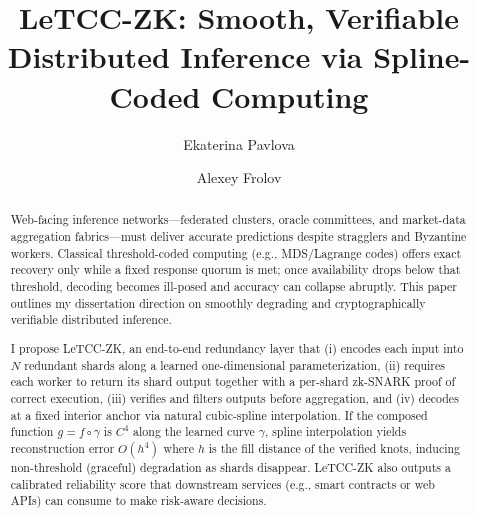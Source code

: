 \documentclass[sigconf]{acmart}
\begin{document}
\title{LeTCC-ZK: Smooth, Verifiable Distributed Inference via Spline-Coded Computing}



\author{Ekaterina Pavlova}

\author{Alexey Frolov}


\renewcommand{\shortauthors}{Pavlova E.}

\begin{abstract}
Web-facing inference networks---federated clusters, oracle committees, and market-data aggregation fabrics---must deliver accurate predictions despite stragglers and Byzantine workers.
Classical threshold-coded computing (e.g., MDS/Lagrange codes) offers exact recovery only while a fixed response quorum is met; once availability drops below that threshold, decoding becomes ill-posed and accuracy can collapse abruptly.
This paper outlines my dissertation direction on smoothly degrading and cryptographically verifiable distributed inference.

I propose LeTCC-ZK, an end-to-end redundancy layer that (i) encodes each input into $N$ redundant shards along a learned one-dimensional parameterization, (ii) requires each worker to return its shard output together with a per-shard zk-SNARK proof of correct execution, (iii) verifies and filters outputs before aggregation, and (iv) decodes at a fixed interior anchor via natural cubic-spline interpolation.
If the composed function $g=f\circ\gamma$ is $C^4$ along the learned curve $\gamma$, spline interpolation yields reconstruction error $O(h^4)$ where $h$ is the fill distance of the verified knots, inducing non-threshold (graceful) degradation as shards disappear.
LeTCC-ZK also outputs a calibrated reliability score that downstream services (e.g., smart contracts or web APIs) can consume to make risk-aware decisions.
\end{abstract}
\end{document}
